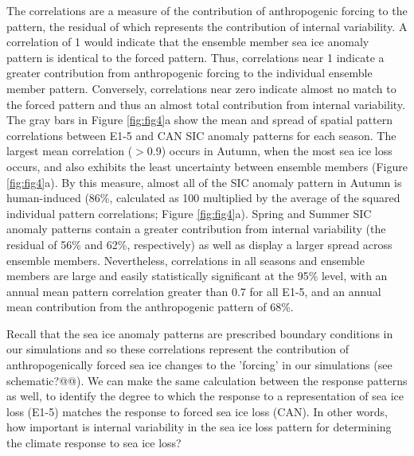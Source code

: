 \documentclass[twocol]{ametsoc}
\begin{document}
The correlations are a measure of the contribution of anthropogenic forcing to the pattern, the residual of which represents the contribution of internal variability. A correlation of 1 would indicate that the ensemble member sea ice anomaly pattern is identical to the forced pattern. Thus, correlations near 1 indicate a greater contribution from anthropogenic forcing to the individual ensemble member pattern. Conversely, correlations near zero indicate almost no match to the forced pattern and thus an almost total contribution from internal variability. The gray bars in Figure \ref{fig:fig4}a show the mean and spread of spatial pattern correlations between E1-5 and CAN SIC anomaly patterns for each season. The largest mean correlation ($>$0.9) occurs in Autumn, when the most sea ice loss occurs, and also exhibits the least uncertainty between ensemble members (Figure \ref{fig:fig4}a). By this measure, almost all of the SIC anomaly pattern in Autumn is human-induced (86\%, calculated as 100 multiplied by the average of the squared individual pattern correlations; Figure \ref{fig:fig4}a). Spring and Summer SIC anomaly patterns contain a greater contribution from internal variability (the residual of 56\% and 62\%, respectively) as well as display a larger spread across ensemble members. Nevertheless, correlations in all seasons and ensemble members are large and easily statistically significant at the 95\% level, with an annual mean pattern correlation greater than 0.7 for all E1-5, and an annual mean contribution from the anthropogenic pattern of 68\%.

Recall that the sea ice anomaly patterns are prescribed boundary conditions in our simulations and so these correlations represent the contribution of anthropogenically forced sea ice changes to the 'forcing' in our simulations (see schematic?@@). We can make the same calculation between the response patterns as well, to identify the degree to which the response to a representation of sea ice loss (E1-5) matches the response to forced sea ice loss (CAN). In other words, how important is internal variability in the sea ice loss pattern for determining the climate response to sea ice loss? 
\end{document}
